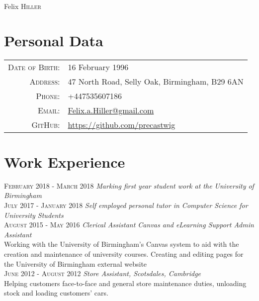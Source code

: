 \documentclass[a4paper, 10pt]{article}
\begin{document}
\pagestyle{empty}

\par{\centering
		{\Huge Felix \textsc{Hiller}
	}\bigskip\par}

\section{Personal Data}

\begin{tabular}{rl}
    \textsc{Date of Birth:} & 16 February 1996\\
    \textsc{Address:}   & 47 North Road, Selly Oak, Birmingham, B29 6AN\\
    \textsc{Phone:}     & +447535607186\\
    \textsc{Email:}     & \href{mailto:felix.a.hiller@gmail.com}{Felix.a.Hiller@gmail.com}\\
	\textsc{GitHub:}	& \url{https://github.com/precastwig}
\end{tabular}

\section{Work Experience}

 \textsc{February 2018 - March 2018} \emph{Marking first year student work at the University of Birmingham}\\
 \textsc{July 2017 - January 2018} \emph{Self employed personal tutor in Computer Science for University Students}\\
 \textsc{August 2015 - May 2016} \emph{Clerical Assistant Canvas and eLearning Support Admin Assistant}\\
 \footnotesize{Working with the University of Birmingham's Canvas system to aid with the creation and maintenance of university courses. Creating and editing pages for the University of Birmingham external website}\\
 \normalsize\textsc{June 2012 - August 2012} \emph{Store Assistant, Scotsdales, Cambridge}\\
 \footnotesize{Helping customers face-to-face and general store maintenance duties, unloading stock and loading customers' cars.}
\normalsize
\end{document}
